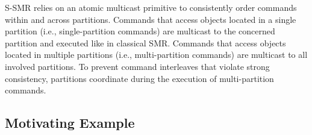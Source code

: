 S-SMR relies on an atomic multicast primitive to consistently order
commands within and across partitions.  Commands that access objects
located in a single partition (i.e., single-partition commands) are
multicast to the concerned partition and executed like in classical
SMR.  Commands that access objects located in multiple partitions
(i.e., multi-partition commands) are multicast to all involved
partitions.  To prevent command interleaves that violate strong
consistency, partitions coordinate during the execution of
multi-partition commands.



\subsection{Motivating Example}
